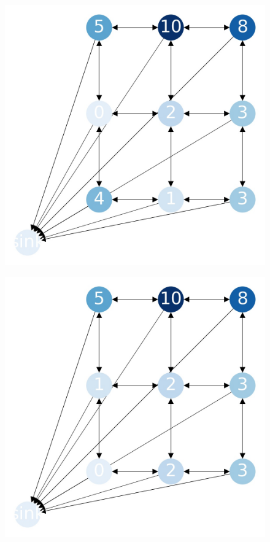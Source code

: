 \documentclass{beamer}
\begin{document}
\begin{frame}
  \begin{figure}[h!]
    \centering
      \includegraphics[scale=0.25]{sandpile_16}
  \end{figure}
\end{frame}


\begin{frame}
  \begin{figure}[h!]
    \centering
      \includegraphics[scale=0.25]{sandpile_17}
  \end{figure}
\end{frame}
\end{document}
